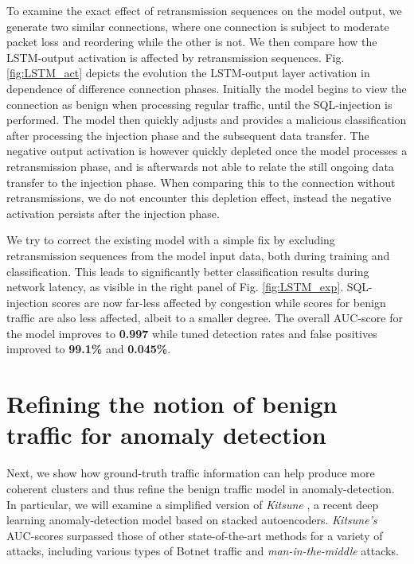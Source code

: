 \documentclass[runningheads]{llncs}
\begin{document}
To examine the exact effect of retransmission sequences on the model output, we generate two similar connections, where one connection is subject to moderate packet loss and reordering while the other is not. We then compare how the LSTM-output activation is affected by retransmission sequences. Fig. \ref{fig:LSTM_act} depicts the evolution the LSTM-output layer activation in dependence of difference connection phases. Initially the model begins to view the connection as benign when processing regular traffic, until the SQL-injection is performed. The model then quickly adjusts and provides a malicious classification after processing the injection phase and the subsequent data transfer. The negative output activation is however quickly depleted once the model processes a retransmission phase, and is afterwards not able to relate the still ongoing data transfer to the injection phase. When comparing this to the connection without retransmissions, we do not encounter this depletion effect, instead the negative activation persists after the injection phase.

We try to correct the existing model with a simple fix by excluding retransmission sequences from the model input data, both during training and classification. This leads to significantly better classification results during network latency, as visible in the right panel of Fig. \ref{fig:LSTM_exp}. SQL-injection scores are now far-less affected by congestion while scores for benign traffic are also less affected, albeit to a smaller degree.
The overall AUC-score for the model improves to \textbf{0.997} while tuned detection rates and false positives improved to \textbf{99.1\%} and \textbf{0.045\%}.

\section{Refining the notion of benign traffic for anomaly detection}\label{Sec:Refining}

Next, we show how ground-truth traffic information can help produce more coherent clusters and thus refine the benign traffic model in anomaly-detection. In particular, we will examine a 
simplified version of \textit{Kitsune} \cite{mirsky2018kitsune}, a recent deep learning anomaly-detection model based on stacked autoencoders. \textit{Kitsune's} AUC-scores surpassed those of other state-of-the-art methods for a variety of attacks, including various types of Botnet traffic and \textit{man-in-the-middle} attacks.
\end{document}
